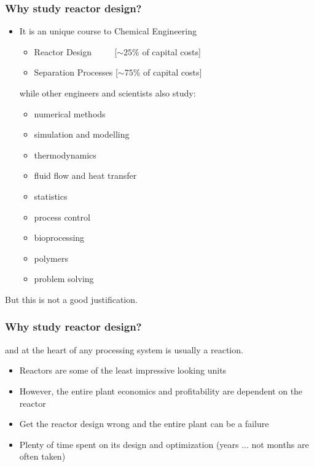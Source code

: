 \begin{frame}\frametitle{Why study reactor design?}
	\begin{itemize}
		\item	It is an unique course to Chemical Engineering
			\begin{itemize}
				\item	Reactor Design $\qquad\,\,$[$\sim 25$\% of capital costs]
				\item	Separation Processes [$\sim 75$\% of capital costs]
			\end{itemize}
			\vspace{12pt}
			while other engineers and scientists also study:
			\begin{itemize}
				\item	numerical methods
				\item	simulation and modelling
				\item	thermodynamics
				\item	fluid flow and heat transfer
				\item	statistics
				\item	process control
				\item	bioprocessing
				\item	polymers
				\item	problem solving
			\end{itemize}
	\end{itemize}
	But this is not a good justification.
\end{frame}

\begin{frame}\frametitle{Why study reactor design?}
	\begin{exampleblock}{}
		\begin{center}
			{\color{myGreen}{Chemical Engineering is about ``processing'' material}}
		\end{center}
	\end{exampleblock}
	and at the heart of any processing system is usually a reaction.
	
	\vspace{12pt}
	\begin{itemize}
		\item	Reactors are some of the least impressive looking units
		\item	However, the entire plant economics and profitability are dependent on the reactor
		\item	Get the reactor design wrong and the entire plant can be a failure
		\item	Plenty of time spent on its design and optimization (years ... not months are often taken)
	\end{itemize}	
\end{frame}

